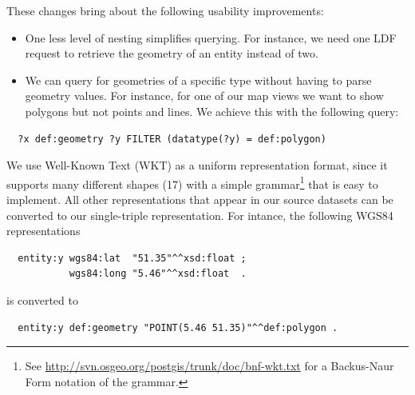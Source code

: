 \documentclass[a4paper]{scrartcl}
\begin{document}
These changes bring about the following usability improvements:

\begin{itemize}
  
\item One less level of nesting simplifies querying.  For instance, we
  need one LDF request to retrieve the geometry of an entity instead
  of two.

\item We can query for geometries of a specific type without having to
  parse geometry values.  For instance, for one of our map views we
  want to show polygons but not points and lines.  We achieve this
  with the following query:

\end{itemize}

\begin{verbatim}
  ?x def:geometry ?y FILTER (datatype(?y) = def:polygon)
\end{verbatim}

We use Well-Known Text (WKT) as a uniform representation format, since
it supports many different shapes (17) with a simple
grammar\footnote{See
  \url{http://svn.osgeo.org/postgis/trunk/doc/bnf-wkt.txt} for a
  Backus-Naur Form notation of the grammar.} that is easy to
implement.  All other representations that appear in our source datasets can be converted to our single-triple representation.  For intance, the following WGS84 representations

\begin{verbatim}
  entity:y wgs84:lat  "51.35"^^xsd:float ;
           wgs84:long "5.46"^^xsd:float  .
\end{verbatim}

is converted to

\begin{verbatim}
  entity:y def:geometry "POINT(5.46 51.35)"^^def:polygon .
\end{verbatim} 

\end{document}
